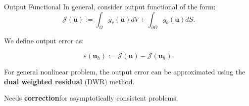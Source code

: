 \documentclass{beamer}
\newcounter{sectionframes}
\newcommand{\setsectionframes}[1]{%
  \setcounter{sectionframes}{#1}%
}
\newcounter{sectionframecount}
\begin{document}
\setsectionframes{5}

\begin{frame}[t]{Output Functional}
  In general, consider output functional of the form:
  \begin{equation}
    \mathcal{J}(\boldsymbol{u}) := \int_{\Omega} g_v(\boldsymbol{u})dV + \int_{\partial \Omega} g_b(\boldsymbol{u})dS.
    \label{e:general_output_functional}
  \end{equation}

We define output error as:

\begin{equation}
  \varepsilon (\boldsymbol{u}_h) := \mathcal{J}(\boldsymbol{u}) - \mathcal{J}(\boldsymbol{u}_h).
\end{equation}

\vspace{8pt}
For general nonlinear problem, the output error can be approximated using the \textbf{dual weighted residual} (DWR) method.

\vspace{10pt}
Needs \textbf{correction}\footnotemark for asymptotically consistent problems.


\end{frame}

\end{document}
